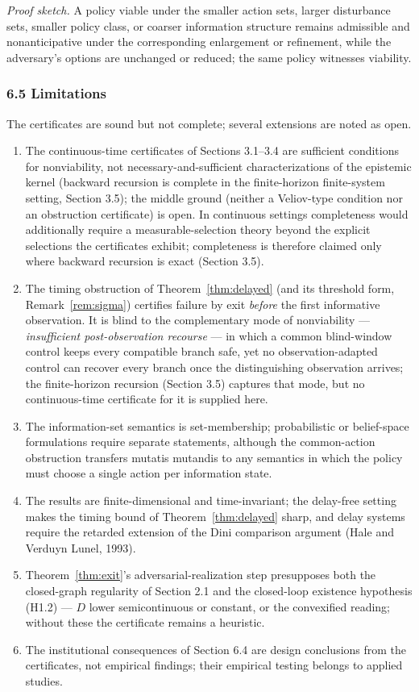 \documentclass[10pt,twocolumn]{article}
\theoremstyle{definition}
\providecommand{\tightlist}{\setlength{\itemsep}{0pt}\setlength{\parskip}{0pt}}
\begin{document}
\emph{Proof sketch.} A policy viable under the smaller action sets, larger disturbance sets, smaller policy class, or coarser information structure remains admissible and nonanticipative under the corresponding enlargement or refinement, while the adversary's options are unchanged or reduced; the same policy witnesses viability.

\subsubsection{6.5 Limitations}\label{limitations}

The certificates are sound but not complete; several extensions are noted as open.

\begin{enumerate}
\def\labelenumi{(\roman{enumi})}
\tightlist
\item
  The continuous-time certificates of Sections 3.1--3.4 are sufficient conditions for nonviability, not necessary-and-sufficient characterizations of the epistemic kernel (backward recursion is complete in the finite-horizon finite-system setting, Section 3.5); the middle ground (neither a Veliov-type condition nor an obstruction certificate) is open. In
continuous settings completeness would additionally require a
measurable-selection theory beyond the explicit selections the
certificates exhibit; completeness is therefore claimed only where
backward recursion is exact (Section 3.5).
\item
  The timing obstruction of Theorem~\ref{thm:delayed} (and its threshold form, Remark~\ref{rem:sigma}) certifies failure by exit \emph{before} the first informative observation. It is blind to the complementary mode of nonviability --- \emph{insufficient post-observation recourse} --- in which a common blind-window control keeps every compatible branch safe, yet no observation-adapted control can recover every branch once the distinguishing observation arrives; the finite-horizon recursion (Section 3.5) captures that mode, but no continuous-time certificate for it is supplied here.
\item
  The information-set semantics is set-membership; probabilistic or belief-space formulations require separate statements, although the common-action obstruction transfers mutatis mutandis to any semantics in which the policy must choose a single action per information state.
\item
  The results are finite-dimensional and time-invariant; the delay-free setting makes the timing bound of Theorem~\ref{thm:delayed} sharp, and delay systems require the retarded extension of the Dini comparison argument (Hale and Verduyn Lunel, 1993).
\item
  Theorem~\ref{thm:exit}'s adversarial-realization step presupposes both the closed-graph regularity of Section 2.1 and the closed-loop existence hypothesis (H1.2) --- \(D\) lower semicontinuous or constant, or the convexified reading; without these the certificate remains a heuristic.
\item
  The institutional consequences of Section 6.4 are design conclusions from the certificates, not empirical findings; their empirical testing belongs to applied studies.
\end{enumerate}
\end{document}
